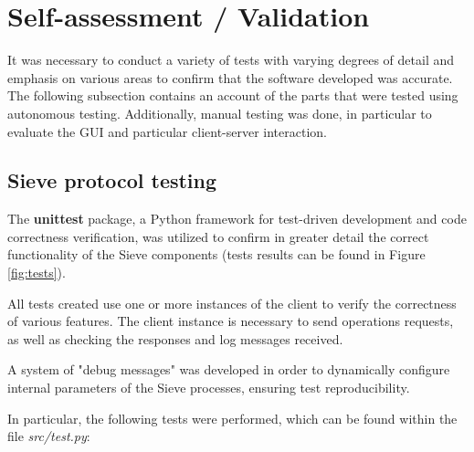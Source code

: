 \documentclass{scrartcl}
\begin{document}
\section{Self-assessment / Validation}

It was necessary to conduct a variety of tests with varying degrees of detail and emphasis on various areas to confirm that the software developed was accurate. The following subsection contains an account of the parts that were tested using autonomous testing. Additionally, manual testing was done, in particular to evaluate the GUI and particular client-server interaction.

\subsection{Sieve protocol testing}
The \textbf{unittest} package, a Python framework for test-driven development and code correctness verification, was utilized to confirm in greater detail the correct functionality of the Sieve components (tests results can be found in Figure \ref{fig:tests}).

All tests created use one or more instances of the client to verify the correctness of various features. The client instance is necessary to send operations requests, as well as checking the responses and log messages received.

A system of "debug messages" was developed in order to dynamically configure internal parameters of the Sieve processes, ensuring test reproducibility.

In particular, the following tests were performed, which can be found within the file \textit{src/test.py}:
\end{document}
